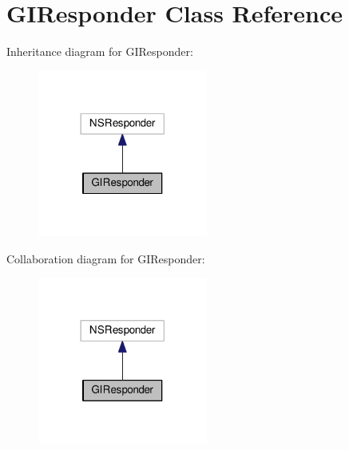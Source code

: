 \hypertarget{interfaceGIResponder}{}\section{G\+I\+Responder Class Reference}
\label{interfaceGIResponder}


Inheritance diagram for G\+I\+Responder\+:\nopagebreak
\begin{figure}[H]
\begin{center}
\leavevmode
\includegraphics[width=158pt]{interfaceGIResponder__inherit__graph}
\end{center}
\end{figure}


Collaboration diagram for G\+I\+Responder\+:\nopagebreak
\begin{figure}[H]
\begin{center}
\leavevmode
\includegraphics[width=158pt]{interfaceGIResponder__coll__graph}
\end{center}
\end{figure}

